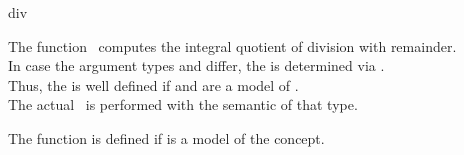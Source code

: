 \begin{ccRefFunction}{div}

\ccDefinition

The function \ccRefName\ computes the integral quotient of division 
with remainder.\\ 

In case the argument types  and  differ, 
the  is determined via .\\
Thus, the  is well defined if  and  
are a model of . \\
The actual \ccRefName\ is performed with the semantic of that type.

The function is defined if 
is a model of the  concept. 



\ccSeeAlso

\\
\\
\\
\\

\end{ccRefFunction}

